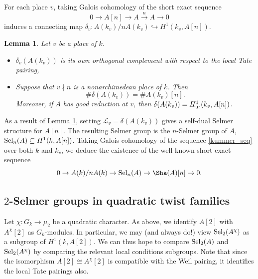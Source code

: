 \documentclass[10pt]{amsart}
\numberwithin{equation}{section}
\newtheorem{lemma}[equation]{Lemma}
\theoremstyle{remark}
\theoremstyle{definition}
\theoremstyle{definition}
\theoremstyle{definition}
\theoremstyle{definition}
\theoremstyle{definition}
\theoremstyle{definition}
\theoremstyle{definition}
\theoremstyle{definition}
\begin{document}
For each place $v$, taking Galois cohomology of the short exact sequence 
\begin{equation} \label{kummer_seq}
0\to A[n] \to A \stackrel{n}{\longrightarrow}A\to 0
\end{equation}
induces a connecting map $\delta_v:A(k_v)/nA(k_v)\hookrightarrow H^1(k_v,A[n])$. 

\begin{lemma} \label{basic_conds_lemma}
Let $v$ be a place of $k$.
\begin{itemize}
\item[(i)] $\delta_v(A(k_v))$ is its own orthogonal complement with respect to the local Tate pairing,
\item[(ii)] Suppose that $v\nmid n$ is a nonarchimedean place of $k$. Then
\[\#\delta(A(k_v))=\#A(k_v)[n].\] 
Moreover, if $A$ has good reduction at $v$, then $\delta(A(k_v))=H^1_{\textup{ur}}(k_v,A[n])$.
 \end{itemize}
\end{lemma}

As a result of  Lemma \ref{basic_conds_lemma}, setting $\mathcal{L}_v=\delta(A(k_v))$ gives a self-dual Selmer structure for $A[n]$. The resulting Selmer group is the $n$-Selmer group of $A$, $\textup{Sel}_n(A)\subseteq H^1(k,A[n])$. Taking Galois cohomology of the sequence \eqref{kummer_seq} over both $k$ and $k_v$, we deduce the existence of the well-known short exact sequence 
\begin{equation} \label{eq: selmer_descent}
0\to A(k)/nA(k)\to \textup{Sel}_n(A)\to \Sha(A)[n]\to 0.
\end{equation}

\subsection{$2$-Selmer groups in quadratic twist families}

Let $\chi:G_k\to \mu_2$ be a quadratic character. As above, we identify $A[2]$ with $A^\chi[2]$ as $G_k$-modules. In particular, we may (and always do!) view $\textup{Sel}_2(A^\chi)$ as a subgroup of $H^1(k,A[2])$. We can thus hope to compare $\textup{Sel}_2(A)$ and $\textup{Sel}_2(A^\chi)$ by comparing the relevant local conditions subgroups. Note that since the isomorphism $A[2]\cong A^\chi[2]$ is compatible with the Weil pairing, it identifies the local Tate pairings also.
\end{document}

